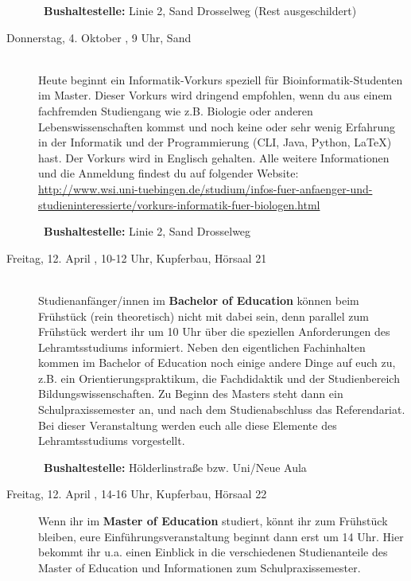 \begin{description}
~\textbf{Bushaltestelle:} Linie 2, Sand Drosselweg (Rest ausgeschildert)



\ifwintersemester
\ifmaster
\ifbinfo
\item[Donnerstag, 4. Oktober \YEAR, 9 Uhr, Sand]\ \\
 Heute beginnt ein Informatik-Vorkurs speziell für Bioinformatik-Studenten im Master. Dieser Vorkurs wird dringend empfohlen, wenn du aus einem fachfremden Studiengang wie z.B. Biologie oder anderen Lebenswissenschaften kommst und noch keine oder sehr wenig Erfahrung in der Informatik und der Programmierung (CLI, Java, Python, \LaTeX) hast. Der Vorkurs wird in Englisch gehalten. Alle weitere Informationen und die Anmeldung findest du auf folgender Website: \\ \url{http://www.wsi.uni-tuebingen.de/studium/infos-fuer-anfaenger-und-studieninteressierte/vorkurs-informatik-fuer-biologen.html}

~\textbf{Bushaltestelle:} Linie 2, Sand Drosselweg
\fi
\fi
\fi



%



\iflehramt
\item[Freitag, 12. April \YEAR, 10-12 Uhr, Kupferbau, Hörsaal 21]\ \\
Studienanfänger/innen im \textbf{Bachelor of Education} können beim Frühstück (rein theoretisch) nicht mit dabei sein, 
denn parallel zum Frühstück werdert ihr um 10 Uhr über die speziellen
Anforderungen des Lehramtsstudiums informiert. Neben den eigentlichen Fachinhalten kommen im
Bachelor of Education noch einige andere Dinge auf euch zu, z.B. ein Orientierungspraktikum, die
Fachdidaktik und der Studienbereich Bildungswissenschaften. Zu Beginn des Masters steht dann
ein Schulpraxissemester an, und nach dem Studienabschluss das Referendariat. Bei dieser Veranstaltung werden euch
alle diese Elemente des Lehramtsstudiums vorgestellt.

~\textbf{Bushaltestelle:} Hölderlinstraße bzw. Uni/Neue Aula

\item[Freitag, 12. April \YEAR, 14-16 Uhr, Kupferbau, Hörsaal 22]
Wenn ihr im \textbf{Master of Education} studiert, könnt ihr zum Frühstück bleiben, eure Einführungsveranstaltung beginnt dann erst um 14 Uhr. 
Hier bekommt ihr u.a. einen Einblick in die verschiedenen Studienanteile des Master of Education und Informationen zum Schulpraxissemester.
\fi



\end{description}
